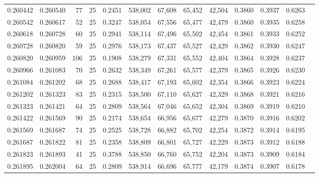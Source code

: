 \begin{tabular}{rrrrrrrrrrrrr}
0.260442 & 0.260540 &    77 &  25 &                                     0.2451 & 538,002 &  67,608 &  65,452 &  42,504 & 0.3860 & 0.3937 & 0.6263 \\
0.260542 & 0.260617 &    52 &  25 &                                     0.3247 & 538,054 &  67,556 &  65,477 &  42,479 & 0.3860 & 0.3935 & 0.6258 \\
0.260618 & 0.260728 &    60 &  25 &                                     0.2941 & 538,114 &  67,496 &  65,502 &  42,454 & 0.3861 & 0.3933 & 0.6252 \\
0.260728 & 0.260820 &    59 &  25 &                                     0.2976 & 538,173 &  67,437 &  65,527 &  42,429 & 0.3862 & 0.3930 & 0.6247 \\
0.260820 & 0.260959 &   106 &  25 &                                     0.1908 & 538,279 &  67,331 &  65,552 &  42,404 & 0.3864 & 0.3928 & 0.6237 \\
0.260966 & 0.261083 &    70 &  25 &                                     0.2632 & 538,349 &  67,261 &  65,577 &  42,379 & 0.3865 & 0.3926 & 0.6230 \\
0.261084 & 0.261202 &    68 &  25 &                                     0.2688 & 538,417 &  67,193 &  65,602 &  42,354 & 0.3866 & 0.3923 & 0.6224 \\
0.261202 & 0.261323 &    83 &  25 &                                     0.2315 & 538,500 &  67,110 &  65,627 &  42,329 & 0.3868 & 0.3921 & 0.6216 \\
0.261323 & 0.261421 &    64 &  25 &                                     0.2809 & 538,564 &  67,046 &  65,652 &  42,304 & 0.3869 & 0.3919 & 0.6210 \\
0.261422 & 0.261569 &    90 &  25 &                                     0.2174 & 538,654 &  66,956 &  65,677 &  42,279 & 0.3870 & 0.3916 & 0.6202 \\
0.261569 & 0.261687 &    74 &  25 &                                     0.2525 & 538,728 &  66,882 &  65,702 &  42,254 & 0.3872 & 0.3914 & 0.6195 \\
0.261687 & 0.261822 &    81 &  25 &                                     0.2358 & 538,809 &  66,801 &  65,727 &  42,229 & 0.3873 & 0.3912 & 0.6188 \\
0.261823 & 0.261893 &    41 &  25 &                                     0.3788 & 538,850 &  66,760 &  65,752 &  42,204 & 0.3873 & 0.3909 & 0.6184 \\
0.261895 & 0.262004 &    64 &  25 &                                     0.2809 & 538,914 &  66,696 &  65,777 &  42,179 & 0.3874 & 0.3907 & 0.6178 \\

\end{tabular}

